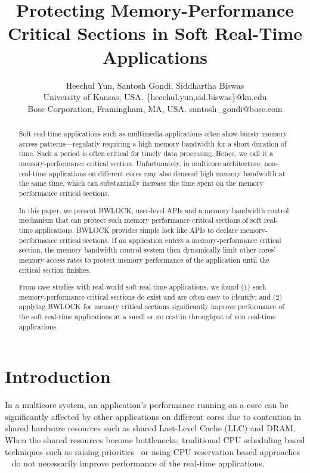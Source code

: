 \documentclass[times, 10pt,onecolumn]{article}
\title{Protecting Memory-Performance Critical Sections in Soft Real-Time Applications}
\author{Heechul Yun, Santosh Gondi, Siddhartha Biswas\\
 University of Kansas, USA. \{heechul.yun,sid.biswas\}@ku.edu\\
 Bose Corporation, Framingham, MA, USA. santosh\_gondi@bose.com
}
\date{}
\begin{document}
\maketitle
\thispagestyle{empty}
\begin{abstract}
Soft real-time applications such as multimedia applications often
show bursty memory access patterns---regularly requiring a high
memory bandwidth for a short duration of time. Such a period is often
critical for timely data processing. Hence, we call it a
memory-performance critical section. Unfortunately, in multicore
architecture, non-real-time applications on different cores may also
demand high memory bandwidth at the same time, which can substantially
increase the time spent on the memory performance critical sections.

In this paper, we present BWLOCK, user-level APIs and a memory
bandwidth control mechanism that can protect such memory performance
critical sections of soft real-time applications. BWLOCK provides
simple lock like APIs to declare memory-performance critical
sections. If an application enters a memory-performance critical
section, the memory bandwidth control system then dynamically limit
other cores' memory access rates to protect memory performance of the
application until the critical section finishes.

From case studies with real-world soft real-time applications, we
found (1) such memory-performance critical sections do exist and are
often easy to identify; and (2) applying BWLOCK for memory critical
sections significantly improve performance of the soft real-time
applications at a small or no cost in throughput of non real-time
applications.
\end{abstract}



\section{Introduction}



In a multicore system, an application's performance running on a core
can be significantly affected by other applications on different cores
due to contention in shared hardware resources such as shared Last-Level
Cache (LLC) and DRAM. When the shared resources become bottlenecks,
traditional CPU scheduling based techniques such as raising
priorities~\cite{lehoczky1989rate} or using CPU reservation based approaches
~\cite{faggioli2009implementation,kato2010ecrts,abeni1998rtss}
do not necessarily improve performance of the real-time applications.
\end{document}

